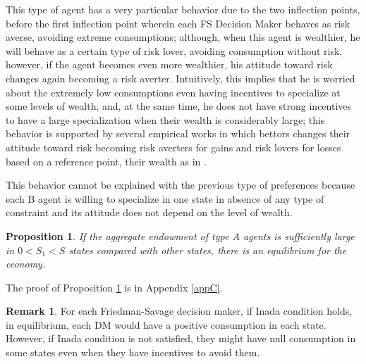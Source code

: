 \documentclass[pdftex]{article}
\numberwithin{equation}{section}
\theoremstyle{th}
\newtheorem{prop}{{Proposition}}%
\newtheorem{proof lemma}{{Proof Lemma}.}
\theoremstyle{definition}
\newtheorem{remark}{Remark}%
\newtheorem*{risk lovers}{Risk lovers}
\newtheorem*{risk averse}{Risk averse}
\begin{document}
{This type of agent has a very particular behavior due to the two inflection points, before the first inflection point wherein each FS Decision Maker behaves as risk averse, avoiding extreme consumptions; although, when this agent is wealthier, he will behave as a certain type of risk lover, avoiding consumption without risk, however, if the agent becomes even more wealthier, his attitude toward risk changes again becoming  a risk averter. Intuitively, this implies that he is worried about the extremely low consumptions  even having incentives to specialize at some levels of wealth, and, at the same time, he does not have strong incentives to have a large specialization when their wealth is considerably large; this behavior is supported by several empirical works in which bettors changes their attitude toward risk becoming risk averters for gains  and risk lovers for losses based on a reference point, their wealth as in \cite{JS}.}


{This behavior cannot be explained with the previous type of preferences because each B agent is willing to specialize in one state in absence of any type of constraint and its attitude does not depend on the level of wealth.}



\begin{prop}
\label{exisFS}
{If the aggregate endowment of type $A$ agents is sufficiently large in $0<S_1<S$ states compared with other states, there is an equilibrium for the economy.}
\end{prop}

The proof of Proposition \ref{exisFS} is in Appendix \ref{appC}.

\begin{remark}
{For each Friedman-Savage decision maker, if Inada condition holds,
 in equilibrium, each DM would have a positive consumption in each state. However, if Inada condition is not satisfied, they might have null consumption in some states even when they have incentives to avoid them.}
\end{remark}
\end{document}
